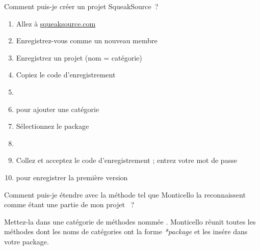 \documentclass[a4paper,10pt,twoside]{book}
\begin{document}
\begin{faq}
Comment puis-je cr\'eer un projet SqueakSource~?
\end{faq}
\answer
\begin{enumerate}
  \item Allez à \url{squeaksource.com}
  \item Enregistrez-vous comme un nouveau membre
  \item Enregistrez un projet (nom = cat\'egorie)
  \item Copiez le code d'enregistrement
  \item {}
  \item {} pour ajouter une cat\'egorie
  \item S\'electionnez le package
  \item {}
  \item Collez et acceptez le code d'enregistrement ; entrez votre mot de passe
  \item {} pour enregistrer la premi\`ere version
\end{enumerate}

\begin{faq}
Comment puis-je \'etendre  avec
la m\'ethode  
tel que Monticello la reconnaissent comme \'etant une partie de mon projet ~?
\end{faq}
\answer
Mettez-la 
dans une cat\'egorie de m\'ethodes nomm\'ee .
Monticello r\'eunit toutes les m\'ethodes 
dont les noms de cat\'egories 
ont la forme \emph{*package} et les ins\'ere dans votre package.
\end{document}
